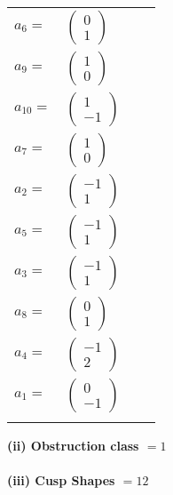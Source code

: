 \documentclass[1p]{elsarticle_modified}
\theoremstyle{definition}
\begin{document}
\begin{tabular}{m{7pt} m{180pt} m{7pt} m{180pt} }
\flushright $a_{6}=$&$\begin{pmatrix}0\\1\end{pmatrix}$ \\
\flushright $a_{9}=$&$\begin{pmatrix}1\\0\end{pmatrix}$ \\
\flushright $a_{10}=$&$\begin{pmatrix}1\\-1\end{pmatrix}$ \\
\flushright $a_{7}=$&$\begin{pmatrix}1\\0\end{pmatrix}$ \\
\flushright $a_{2}=$&$\begin{pmatrix}-1\\1\end{pmatrix}$ \\
\flushright $a_{5}=$&$\begin{pmatrix}-1\\1\end{pmatrix}$ \\
\flushright $a_{3}=$&$\begin{pmatrix}-1\\1\end{pmatrix}$ \\
\flushright $a_{8}=$&$\begin{pmatrix}0\\1\end{pmatrix}$ \\
\flushright $a_{4}=$&$\begin{pmatrix}-1\\2\end{pmatrix}$ \\
\flushright $a_{1}=$&$\begin{pmatrix}0\\-1\end{pmatrix}$\\&\end{tabular}
\flushleft \textbf{(ii) Obstruction class $= 1$}\\~\\
\flushleft \textbf{(iii) Cusp Shapes $= 12$}\\~\\
\end{document}
